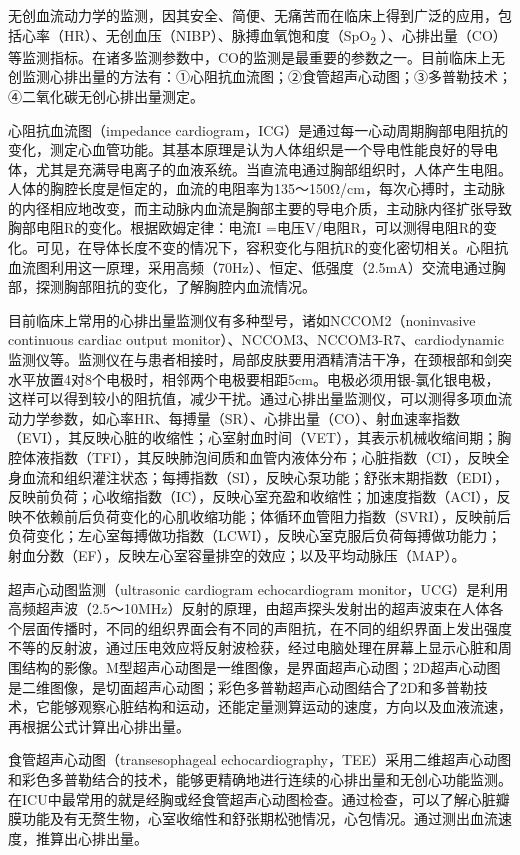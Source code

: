 无创血流动力学的监测，因其安全、简便、无痛苦而在临床上得到广泛的应用，包括心率（HR）、无创血压（NIBP）、脉搏血氧饱和度（SpO\textsubscript{2}
）、心排出量（CO）等监测指标。在诸多监测参数中，CO的监测是最重要的参数之一。目前临床上无创监测心排出量的方法有：①心阻抗血流图；②食管超声心动图；③多普勒技术；④二氧化碳无创心排出量测定。

心阻抗血流图（impedance
cardiogram，ICG）是通过每一心动周期胸部电阻抗的变化，测定心血管功能。其基本原理是认为人体组织是一个导电性能良好的导电体，尤其是充满导电离子的血液系统。当直流电通过胸部组织时，人体产生电阻。人体的胸腔长度是恒定的，血流的电阻率为135～150Ω/cm，每次心搏时，主动脉的内径相应地改变，而主动脉内血流是胸部主要的导电介质，主动脉内径扩张导致胸部电阻R的变化。根据欧姆定律：电流I
=电压V/电阻R，可以测得电阻R的变化。可见，在导体长度不变的情况下，容积变化与阻抗R的变化密切相关。心阻抗血流图利用这一原理，采用高频（70Hz）、恒定、低强度（2.5mA）交流电通过胸部，探测胸部阻抗的变化，了解胸腔内血流情况。

目前临床上常用的心排出量监测仪有多种型号，诸如NCCOM2（noninvasive
continuous cardiac output
monitor）、NCCOM3、NCCOM3-R7、cardiodynamic监测仪等。监测仪在与患者相接时，局部皮肤要用酒精清洁干净，在颈根部和剑突水平放置4对8个电极时，相邻两个电极要相距5cm。电极必须用银-氯化银电极，这样可以得到较小的阻抗值，减少干扰。通过心排出量监测仪，可以测得多项血流动力学参数，如心率HR、每搏量（SR）、心排出量（CO）、射血速率指数（EVI），其反映心脏的收缩性；心室射血时间（VET），其表示机械收缩间期；胸腔体液指数（TFI），其反映肺泡间质和血管内液体分布；心脏指数（CI），反映全身血流和组织灌注状态；每搏指数（SI），反映心泵功能；舒张末期指数（EDI），反映前负荷；心收缩指数（IC），反映心室充盈和收缩性；加速度指数（ACI），反映不依赖前后负荷变化的心肌收缩功能；体循环血管阻力指数（SVRI），反映前后负荷变化；左心室每搏做功指数（LCWI），反映心室克服后负荷每搏做功能力；射血分数（EF），反映左心室容量排空的效应；以及平均动脉压（MAP）。

超声心动图监测（ultrasonic cardiogram echocardiogram
monitor，UCG）是利用高频超声波（2.5～10MHz）反射的原理，由超声探头发射出的超声波束在人体各个层面传播时，不同的组织界面会有不同的声阻抗，在不同的组织界面上发出强度不等的反射波，通过压电效应将反射波检获，经过电脑处理在屏幕上显示心脏和周围结构的影像。M型超声心动图是一维图像，是界面超声心动图；2D超声心动图是二维图像，是切面超声心动图；彩色多普勒超声心动图结合了2D和多普勒技术，它能够观察心脏结构和运动，还能定量测算运动的速度，方向以及血液流速，再根据公式计算出心排出量。

食管超声心动图（transesophageal
echocardiography，TEE）采用二维超声心动图和彩色多普勒结合的技术，能够更精确地进行连续的心排出量和无创心功能监测。在ICU中最常用的就是经胸或经食管超声心动图检查。通过检查，可以了解心脏瓣膜功能及有无赘生物，心室收缩性和舒张期松弛情况，心包情况。通过测出血流速度，推算出心排出量。

